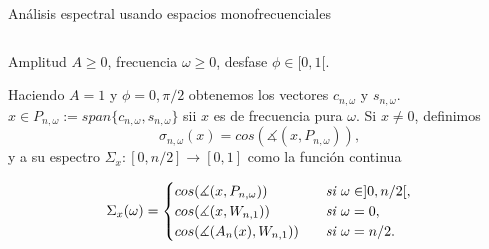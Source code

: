 \documentclass[final,hyperref={pdfpagelabels=false}]{beamer}
\newcommand{\IR}{\mathbb{R}}
\begin{document}
\begin{frame}
\begin{columns}
\begin{column}{.49\textwidth}
\begin{block}{An\'alisis espectral usando espacios monofrecuenciales}
\begin{columns}
\begin{column}{.59\textwidth}
				\begin{center}
				Amplitud $A \geq 0$, frecuencia $\omega \geq 0$, desfase 
				$\phi \in [0,1[$.
				\end{center}				              	
              	Haciendo $A =1$ y $\phi = 0, \pi/2$ obtenemos los vectores
              	$c_{n, \omega}$ y $s_{n, \omega}$.
              	$x \in P_{n, \omega} := span \{ c_{n, \omega}, s_{n, \omega} \}$
              	sii $x$ es de frecuencia pura $\omega$. Si $x \neq 0$, definimos
              	\[
              	\sigma_{n, \omega} (x) =  cos(\measuredangle(x, P_{n, \omega})),
              	\]
              	y a su espectro $\Sigma_{x}: [0, n/2] \longrightarrow [0,1]$
              	como la funci\'on continua 
              	
              	\begin{align*}
\Sigma_{x}(\omega)= \begin{cases}
cos(\measuredangle(x, P_{n, \omega})) & 
\hspace{0.2cm} \textit{ si } \omega \in ]0, n/2[, \\
cos(\measuredangle(x, W_{n,1})) & \hspace{0.2cm} \textit{ si } \omega = 0, \\
cos(\measuredangle(A_{n}(x), W_{n,1})) & \hspace{0.2cm} \textit{ si } \omega = n/2.
\end{cases}
\end{align*}
              
                \end{column}
\end{columns}
\end{block}
\end{column}
\end{columns}
\end{frame}
\end{document}
